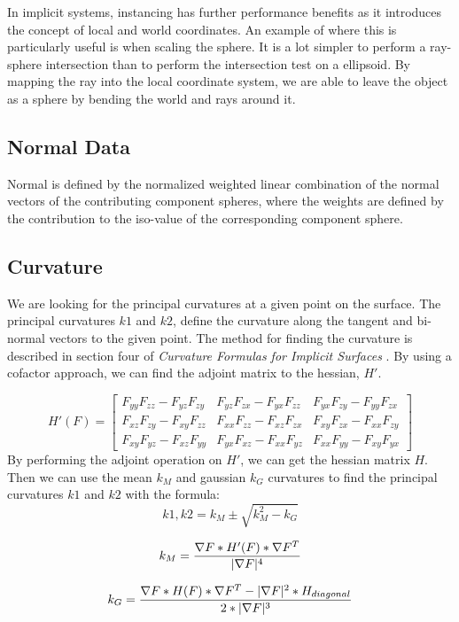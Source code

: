 \documentclass[conference]{acmsiggraph}
\begin{document}
In implicit systems, instancing has further performance benefits as it
introduces the concept of local and world coordinates. An example of where this
is particularly useful is when scaling the sphere. It is a lot simpler to
perform a ray-sphere intersection than to perform the intersection test on a
ellipsoid. By mapping the ray into the local coordinate system, we are able to
leave the object as a sphere by bending the world and rays around it.

\subsection{Normal Data}
Normal is defined by the normalized weighted linear combination of the normal
vectors of the contributing component spheres, where the weights are defined by
the contribution to the iso-value of the corresponding component
sphere\cite{Wyvill}.

\subsection{Curvature}
We are looking for the principal curvatures at a given point on the surface.
The principal curvatures $k1$ and $k2$, define the curvature along the tangent
and bi-normal vectors to the given point. The method for finding the curvature
is described in section four of \textit{Curvature Formulas for Implicit
Surfaces} \cite{Goldman2005}. By using a cofactor approach, we can find the adjoint matrix to the
hessian, $H'$. 

$$
H'(F) =
\begin{bmatrix}
	F_{yy}F_{zz} - F_{yz}F_{zy} & F_{yz}F_{zx} - F_{yx}F_{zz} & F_{yx}F_{zy} - F_{yy}F_{zx} \\
	F_{xz}F_{zy} - F_{xy}F_{zz} & F_{xx}F_{zz} - F_{xz}F_{zx} & F_{xy}F_{zx} - F_{xx}F_{zy} \\
	F_{xy}F_{yz} - F_{xz}F_{yy} & F_{yx}F_{xz} - F_{xx}F_{yz} & F_{xx}F_{yy} - F_{xy}F_{yx}
\end{bmatrix}
$$
By performing the adjoint operation on $H'$, we can get the
hessian matrix $H$. Then we can use the mean $k_M$ and gaussian $k_G$
curvatures to find
the principal curvatures $k1$ and $k2$ with the formula:
$$k1, k2 = k_M \pm \sqrt{k^2_{M} - k_G}$$


$$k_M = {\nabla F * H'(F) * \nabla F^T \over |\nabla F|^4}$$

$$k_G = {\nabla F * H(F) * \nabla F^T - |\nabla F|^2 * H_{diagonal} \over 2 *
|\nabla F|^3}$$
\end{document}
